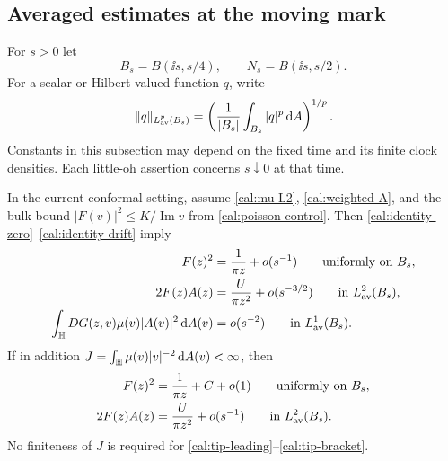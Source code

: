 \subsection{Averaged estimates at the moving mark}
\label{cal:tip-subsection}

For $s>0$ let
\[
 B_s=B(\ii s,s/4),\qquad N_s=B(\ii s,s/2).
\]
For a scalar or Hilbert-valued function $q$, write
\[
 \|q\|_{L^p_{\rm av}(B_s)}
   =\left(\frac1{|B_s|}\int_{B_s}|q|^p\,\mathrm d A\right)^{1/p}.
\]
Constants in this subsection may depend on the fixed time and its
finite clock densities.  Each little-oh assertion concerns
$s\downarrow0$ at that time.

\begin{lemma}
\label{cal:tip-expansions}
In the current conformal setting, assume
\eqref{cal:mu-L2}, \eqref{cal:weighted-A}, and the bulk bound
$|F(v)|^2\leq K/\operatorname{Im}v$ from
\eqref{cal:poisson-control}. Then
\eqref{cal:identity-zero}--\eqref{cal:identity-drift} imply
\begin{align}
 F(z)^2&=\frac1{\pi z}+o(s^{-1})
                   \qquad\text{uniformly on }B_s,
 \label{cal:tip-leading}\\
 2F(z)A(z)&=\frac U{\pi z^2}+o(s^{-3/2})
                   \qquad\text{in }L^2_{\rm av}(B_s),
 \label{cal:tip-mixed-weak}\\
 \int_{\mathbb H}DG(z,v)\mu(v)|A(v)|^2\,\mathrm d A(v)
             &=o(s^{-2})
                   \qquad\text{in }L^1_{\rm av}(B_s).
 \label{cal:tip-bracket}
\end{align}
If in addition $J=\int_{\mathbb H}\mu(v)|v|^{-2}\,\mathrm d A(v)<\infty$, then
\begin{align}
 F(z)^2&=\frac1{\pi z}+C+o(1)
                   \qquad\text{uniformly on }B_s,
 \label{cal:tip-constant}\\
 2F(z)A(z)&=\frac U{\pi z^2}+o(s^{-1})
                   \qquad\text{in }L^2_{\rm av}(B_s).
 \label{cal:tip-mixed-strong}
\end{align}
No finiteness of $J$ is required for
\eqref{cal:tip-leading}--\eqref{cal:tip-bracket}.
\end{lemma}

